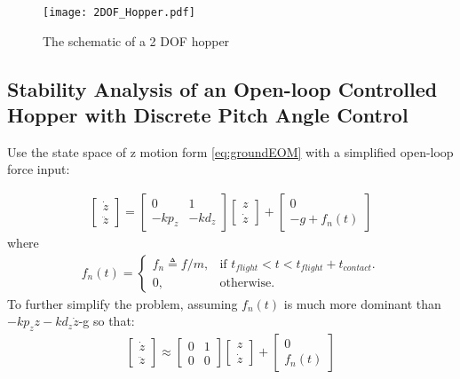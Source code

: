 \begin{figure}[h]
	\centering
	\texttt{[image: 2DOF\_Hopper.pdf]} 
	\caption{The schematic of a 2 DOF hopper}
	\label{fig.2DOF-Hopper}
\end{figure}

\subsection{Stability Analysis of an Open-loop Controlled Hopper with Discrete Pitch Angle Control}
Use the state space of z motion form \ref{eq:groundEOM} with a simplified open-loop force input:

\begin{align}
\begin{bmatrix}
\dot z  \\
\ddot z 
\end{bmatrix} = \begin{bmatrix}
0 & 1 \\
-kp_z & -kd_z
\end{bmatrix}\begin{bmatrix}
 z  \\
\dot z 
\end{bmatrix} + 
\begin{bmatrix}
0  \\
-g+f_n(t)
\end{bmatrix}
\end{align}
where 
\begin{align}
 f_n(t)=\begin{cases}
    f_n\triangleq f/m, & \text{if $t_{flight}<t<t_{flight}+t_{contact}$}.\\
    0, & \text{otherwise}.
  \end{cases}
\end{align}
To further simplify the problem, assuming $f_n(t)$ is much more dominant than $-kp_zz-kd_z\dot z$-g so that:
\begin{align}
\label{eq:SimpleHopper}
\begin{bmatrix}
\dot z  \\
\ddot z 
\end{bmatrix} \approx \begin{bmatrix}
0 & 1 \\
0 & 0
\end{bmatrix}\begin{bmatrix}
 z  \\
\dot z 
\end{bmatrix} + 
\begin{bmatrix}
0  \\
f_n(t)
\end{bmatrix}
\end{align}
